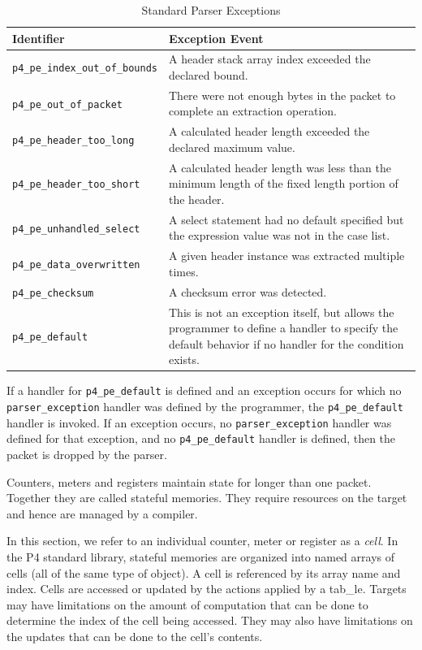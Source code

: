 \documentclass[12pt]{article}
\begin{document}
\begin{table}[H]
\begin{center}
\begin{tabular}{| l | p{} |} \hline
\textbf{Identifier} &
\textbf{Exception Event} \\ \hline
\texttt{p4_pe_index_out_of_bounds} &
A header stack array index exceeded the declared bound. \\ \hline
\texttt{p4_pe_out_of_packet} &
There were not enough bytes in the packet to complete an extraction operation. \\ \hline
\texttt{p4_pe_header_too_long} &
A calculated header length exceeded the declared maximum value. \\ \hline
\texttt{p4_pe_header_too_short} &
A calculated header length was less than the minimum length of the fixed length 
portion of the header. \\ \hline
\texttt{p4_pe_unhandled_select} &
A select statement had no default specified but the expression value was not 
in the case list. \\ \hline
\texttt{p4_pe_data_overwritten} &
A given header instance was extracted multiple times. \\ \hline
\texttt{p4_pe_checksum} &
A checksum error was detected. \\ \hline
\texttt{p4_pe_default} &
This is not an exception itself, but allows the programmer to define a handler 
to specify the default behavior if no handler for the condition exists. \\
\hline
\end{tabular}
\end{center}
\caption{Standard Parser Exceptions}
\label{tab:parserexceptions}
\end{table}

If a handler for \texttt{p4_pe_default} is defined and an exception occurs for
which no \texttt{parser_exception} handler was defined by the programmer, the
\texttt{p4_pe_default} handler is invoked. If an exception occurs, no
\texttt{parser_exception} handler was defined for that exception, and no
\texttt{p4_pe_default} handler is defined, then the packet is dropped by the
parser.


Counters, meters and registers maintain state for longer than one packet. 
Together they are called stateful memories. They require resources on the 
target and hence are managed by a compiler.

In this section, we refer to an individual counter, meter or register as a 
\textit{cell}. In the P4 standard library, stateful memories are organized into named arrays of cells 
(all of the same type of object). A cell is referenced by its array name and 
index. Cells are accessed or updated by the actions applied by a tab_le. Targets 
may have limitations on the amount of computation that can be done to determine 
the index of the cell being accessed.  They may also have limitations on 
the updates that can be done to the cell's contents.
\end{document}
